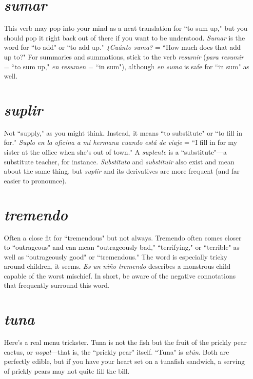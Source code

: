 \section{\emph{sumar}}

This verb may pop into your mind as a neat translation for ``to sum up," but you should pop it right back out of there if
you want to be understood. \emph{Sumar} is the word for ``to add" or ``to add
up." \emph{¿Cuánto suma?} = ``How much does that add up to?" For summaries and summations, stick to the verb \emph{resumir} (\emph{para resumir} = ``to
sum up," \emph{en resumen} = ``in sum"), although \emph{en suma} is safe for ``in sum" as well.

\section{\emph{suplir}}

Not ``supply," as you might think. Instead, it means
``to substitute" or ``to fill in for." \emph{Suplo en la oficina a mi hermana
cuando está de viaje} = ``I fill in for my sister at the office when she's
out of town." A \emph{suplente} is a ``substitute"---a substitute teacher, for
instance. \emph{Substituto} and \emph{substituir} also exist and mean about the
same thing, but \emph{suplir} and its derivatives are more frequent (and far
easier to pronounce).

\section{\emph{tremendo}}

Often a close fit for ``tremendous" but not always. Tremendo often comes closer to ``outrageous" and can mean
``outrageously bad," ``terrifying," or ``terrible" as well as ``outrageously
good" or ``tremendous." The word is especially tricky around children,
it seems. \emph{Es un niño tremendo} describes a monstrous child capable of
the worst mischief. In short, be aware of the negative connotations
that frequently surround this word.

\section{\emph{tuna}}

Here's a real menu trickster. Tuna is not the fish but
the fruit of the prickly pear cactus, or \emph{nopal}---that is, the ``prickly
pear" itself. ``Tuna" is \emph{atún}. Both are perfectly edible, but if you have
your heart set on a tunafish sandwich, a serving of prickly pears may
not quite fill the bill.


